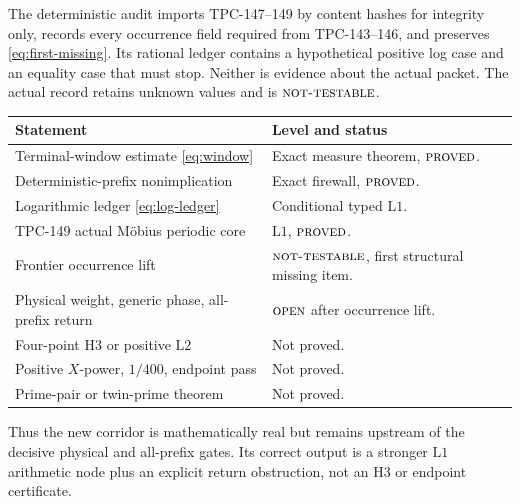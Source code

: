 \documentclass[11pt]{article}
\theoremstyle{definition}
\theoremstyle{remark}
\newcommand{\Lone}{\mathrm{L1}}
\newcommand{\Ltwo}{\mathrm{L2}}
\newcommand{\NT}{\textnormal{\textsc{not-testable}}}
\newcommand{\PROVED}{\textnormal{\textsc{proved}}}
\newcommand{\OPEN}{\textnormal{\textsc{open}}}
\begin{document}
The deterministic audit imports TPC-147--149 by content hashes for
integrity only, records every occurrence field required from
TPC-143--146, and preserves \eqref{eq:first-missing}.  Its rational
ledger contains a hypothetical positive log case and an equality
case that must stop.  Neither is evidence about the actual packet.
The actual record retains unknown values and is \(\NT\).

\begin{center}
\small
\begin{tabularx}{\textwidth}{@{}p{}Y@{}}
\toprule
Statement & Level and status\\
\midrule
Terminal-window estimate \eqref{eq:window} &
Exact measure theorem, \(\PROVED\).\\
Deterministic-prefix nonimplication &
Exact firewall, \(\PROVED\).\\
Logarithmic ledger \eqref{eq:log-ledger} &
Conditional typed \(\Lone\).\\
TPC-149 actual M\"obius periodic core &
\(\Lone\), \(\PROVED\).\\
Frontier occurrence lift &
\(\NT\), first structural missing item.\\
Physical weight, generic phase, all-prefix return &
\(\OPEN\) after occurrence lift.\\
Four-point H3 or positive \(\Ltwo\) &
Not proved.\\
Positive \(X\)-power, \(1/400\), endpoint pass &
Not proved.\\
Prime-pair or twin-prime theorem & Not proved.\\
\bottomrule
\end{tabularx}
\end{center}

Thus the new corridor is mathematically real but remains upstream of
the decisive physical and all-prefix gates.  Its correct output is a
stronger \(\Lone\) arithmetic node plus an explicit return
obstruction, not an H3 or endpoint certificate.

\begingroup
\footnotesize
\raggedright


\endgroup
\end{document}
